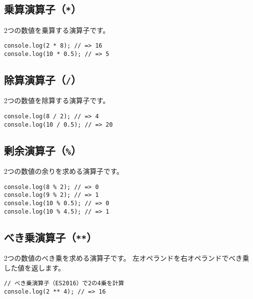 \hypertarget{multiplication-operator}{%
\subsection{\texorpdfstring{乗算演算子（\texttt{*}）}{乗算演算子（*）}}\label{multiplication-operator}}

2つの数値を乗算する演算子です。

\begin{lstlisting}
console.log(2 * 8); // => 16
console.log(10 * 0.5); // => 5
\end{lstlisting}

\hypertarget{division-operator}{%
\subsection{\texorpdfstring{除算演算子（\texttt{/}）}{除算演算子（/）}}\label{division-operator}}

2つの数値を除算する演算子です。

\begin{lstlisting}
console.log(8 / 2); // => 4
console.log(10 / 0.5); // => 20
\end{lstlisting}

\hypertarget{modulus-operator}{%
\subsection{\texorpdfstring{剰余演算子（\texttt{\%}）}{剰余演算子（\%）}}\label{modulus-operator}}

2つの数値の余りを求める演算子です。

\begin{lstlisting}
console.log(8 % 2); // => 0
console.log(9 % 2); // => 1
console.log(10 % 0.5); // => 0
console.log(10 % 4.5); // => 1
\end{lstlisting}

\hypertarget{pow-operator}{%
\subsection{べき乗演算子（\texttt{**}）\protect{}}\label{pow-operator}}

2つの数値のべき乗を求める演算子です。
左オペランドを右オペランドでべき乗した値を返します。

\begin{lstlisting}
// べき乗演算子（ES2016）で2の4乗を計算
console.log(2 ** 4); // => 16
\end{lstlisting}


